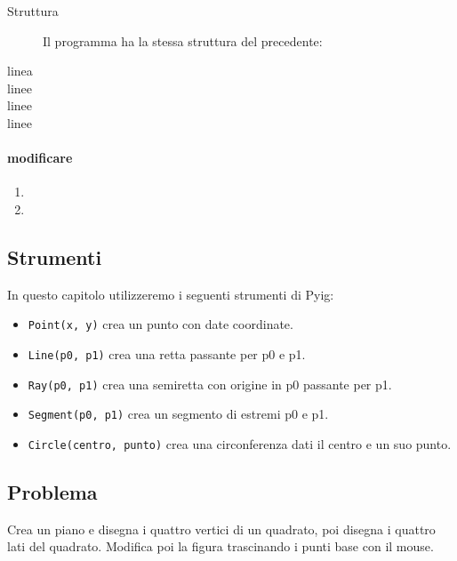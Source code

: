 \begin{description}
 \item [Struttura] 
 Il programma ha la stessa struttura del precedente:
 \item [linea ]
 
 \item [linee ]
 
 \item [linee ]
 \item [linee ]
\end{description}

\begin{osservazione}

\end{osservazione}

\paragraph{modificare}
\begin{enumerate} [noitemsep]
 \item 
 \item 
\end{enumerate}

\subsection{Strumenti}

In questo capitolo utilizzeremo i seguenti strumenti di Pyig:
\begin{itemize} [noitemsep]
\item \texttt{Point(x, y)} crea un punto con date coordinate.
\item \texttt{Line(p0, p1)} crea una retta passante per p0 e p1.
\item \texttt{Ray(p0, p1)} crea una semiretta con origine in p0 passante per p1.
\item \texttt{Segment(p0, p1)} crea un segmento di estremi p0 e p1.
\item \texttt{Circle(centro, punto)} crea una circonferenza dati il centro e 
un suo punto.

\end{itemize}


\subsection{Problema}

Crea un piano e disegna i quattro vertici di un quadrato, poi
disegna i quattro lati del quadrato.
Modifica poi la figura trascinando i punti base con il mouse.

